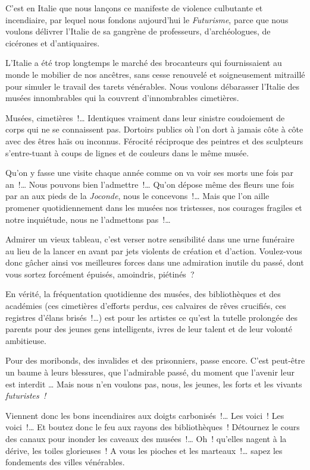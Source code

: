 \documentclass[french,twoside]{book} %
\begin{document}
C’est en Italie que nous lançons ce manifeste de violence culbutante et incendiaire, par lequel nous fondons aujourd’hui le \emph{Futurisme}, parce que nous voulons délivrer l’Italie de sa gangrène de professeurs, d’archéologues, de cicérones et d’antiquaires.\par
L’Italie a été trop longtemps le marché des brocanteurs qui fournissaient au monde le mobilier de nos ancêtres, sans cesse renouvelé et soigneusement mitraillé pour simuler le travail des tarets vénérables. Nous voulons débarasser l’Italie des musées innombrables qui la couvrent d’innombrables cimetières.\par
Musées, cimetières !… Identiques vraiment dans leur sinistre coudoiement de corps qui ne se connaissent pas. Dortoirs publics où l’on dort à jamais côte à côte avec des êtres haïs ou inconnus. Férocité réciproque des peintres et des sculpteurs s’entre-tuant à coups de lignes et de couleurs dans le même musée.\par
Qu’on y fasse une visite chaque année comme on va voir ses morts une fois par an !… Nous pouvons bien l’admettre !… Qu’on dépose même des fleurs une fois par an aux pieds de la \emph{Joconde}, nous le concevons !… Mais que l’on aille promener quotidiennement dans les musées nos tristesses, nos courages fragiles et notre inquiétude, nous ne l’admettons pas !…\par
Admirer un vieux tableau, c’est verser notre sensibilité dans une urne funéraire au lieu de la lancer en avant par jets violents de création et d’action. Voulez-vous donc gâcher ainsi vos meilleures forces dans une admiration inutile du passé, dont vous sortez forcément épuisés, amoindris, piétinés ?\par
En vérité, la fréquentation quotidienne des musées, des bibliothèques et des académies (ces cimetières d’efforts perdus, ces calvaires de rêves crucifiés, ces registres d’élans brisés !…) est pour les artistes ce qu’est la tutelle prolongée des parents pour des jeunes gens intelligents, ivres de leur talent et de leur volonté ambitieuse.\par
Pour des moribonds, des invalides et des prisonniers, passe encore. C’est peut-être un baume à leurs blessures, que l’admirable passé, du moment que l’avenir leur est interdit … Mais nous n’en voulons pas, nous, les jeunes, les forts et les vivants \emph{futuristes !}\par
Viennent donc les bons incendiaires aux doigts carbonisés !… Les voici ! Les voici !… Et boutez donc le feu aux rayons des bibliothèques ! Détournez le cours des canaux pour inonder les caveaux des musées !… Oh ! qu’elles nagent à la dérive, les toiles glorieuses ! A vous les pioches et les marteaux !… sapez les fondements des villes vénérables.\par
\end{document}
